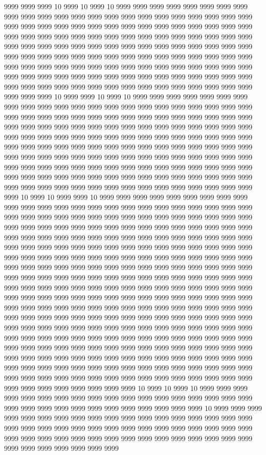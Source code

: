 9999 9999 9999 10 9999 10 9999 10 9999 9999 9999 9999 9999 9999 9999 9999 9999 9999 9999 9999 9999 9999 9999 9999 9999 9999 9999 9999 9999 9999 9999 9999 9999 9999 9999 9999 9999 9999 9999 9999 9999 9999 9999 9999 9999 9999 9999 9999 9999 9999 9999 9999 9999 9999 9999 9999 9999 9999 9999 9999 9999 9999 9999 9999 9999 9999 9999 9999 9999 9999 9999 9999 9999 9999 9999 9999 9999 9999 9999 9999 9999 9999 9999 9999 9999 9999 9999 9999 9999 9999 9999 9999 9999 9999 9999 9999 9999 9999 9999 9999 9999 9999 9999 9999 9999 9999 9999 9999 9999 9999 9999 9999 9999 9999 9999 9999 9999 9999 9999 9999 9999 9999 9999 9999 9999 9999 9999 9999 9999 9999 9999 9999 9999 9999 9999 9999 9999 9999 9999 10 9999 9999 10 9999 10 9999 9999 9999 9999 9999 9999 9999 9999 9999 9999 9999 9999 9999 9999 9999 9999 9999 9999 9999 9999 9999 9999 9999 9999 9999 9999 9999 9999 9999 9999 9999 9999 9999 9999 9999 9999 9999 9999 9999 9999 9999 9999 9999 9999 9999 9999 9999 9999 9999 9999 9999 9999 9999 9999 9999 9999 9999 9999 9999 9999 9999 9999 9999 9999 9999 9999 9999 9999 9999 9999 9999 9999 9999 9999 9999 9999 9999 9999 9999 9999 9999 9999 9999 9999 9999 9999 9999 9999 9999 9999 9999 9999 9999 9999 9999 9999 9999 9999 9999 9999 9999 9999 9999 9999 9999 9999 9999 9999 9999 9999 9999 9999 9999 9999 9999 9999 9999 9999 9999 9999 9999 9999 9999 9999 9999 9999 9999 9999 9999 9999 9999 9999 9999 9999 9999 9999 9999 9999 9999 9999 9999 9999 9999 10 9999 10 9999 9999 10 9999 9999 9999 9999 9999 9999 9999 9999 9999 9999 9999 9999 9999 9999 9999 9999 9999 9999 9999 9999 9999 9999 9999 9999 9999 9999 9999 9999 9999 9999 9999 9999 9999 9999 9999 9999 9999 9999 9999 9999 9999 9999 9999 9999 9999 9999 9999 9999 9999 9999 9999 9999 9999 9999 9999 9999 9999 9999 9999 9999 9999 9999 9999 9999 9999 9999 9999 9999 9999 9999 9999 9999 9999 9999 9999 9999 9999 9999 9999 9999 9999 9999 9999 9999 9999 9999 9999 9999 9999 9999 9999 9999 9999 9999 9999 9999 9999 9999 9999 9999 9999 9999 9999 9999 9999 9999 9999 9999 9999 9999 9999 9999 9999 9999 9999 9999 9999 9999 9999 9999 9999 9999 9999 9999 9999 9999 9999 9999 9999 9999 9999 9999 9999 9999 9999 9999 9999 9999 9999 9999 9999 9999 9999 9999 9999 9999 9999 9999 9999 9999 9999 9999 9999 9999 9999 9999 9999 9999 9999 9999 9999 9999 9999 9999 9999 9999 9999 9999 9999 9999 9999 9999 9999 9999 9999 9999 9999 9999 9999 9999 9999 9999 9999 9999 9999 9999 9999 9999 9999 9999 9999 9999 9999 9999 9999 9999 9999 9999 9999 9999 9999 9999 9999 9999 9999 9999 9999 9999 9999 9999 9999 9999 9999 9999 9999 9999 9999 9999 9999 9999 9999 9999 9999 9999 9999 9999 9999 9999 9999 9999 9999 9999 9999 9999 9999 9999 9999 9999 9999 9999 9999 9999 9999 9999 9999 9999 9999 9999 9999 9999 9999 9999 9999 9999 9999 9999 9999 9999 9999 9999 9999 9999 9999 9999 9999 9999 9999 9999 9999 9999 9999 9999 9999 9999 9999 9999 9999 9999 9999 9999 9999 9999 9999 9999 9999 9999 9999 10 9999 10 9999 10 9999 9999 9999 9999 9999 9999 9999 9999 9999 9999 9999 9999 9999 9999 9999 9999 9999 9999 9999 9999 9999 9999 9999 9999 9999 9999 9999 9999 9999 9999 10 9999 9999 9999 9999 9999 9999 9999 9999 9999 9999 9999 9999 9999 9999 9999 9999 9999 9999 9999 9999 9999 9999 9999 9999 9999 9999 9999 9999 9999 9999 9999 9999 9999 9999 9999 9999 9999 9999 9999 9999 9999 9999 9999 9999 9999 9999 9999 9999 9999 9999 9999 9999 9999 9999 9999 